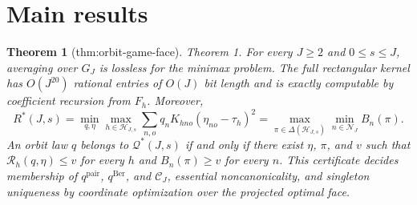 \documentclass{article}
\newtheorem{theorem}{Theorem}
\begin{document}
\section{Main results}

\begin{theorem}[thm:orbit-game-face]\label{thm:orbit-game-face}
Theorem 1. For every \(J\ge2\) and \(0\le s\le J\), averaging over \(G_J\) is lossless for the minimax problem. The full rectangular kernel has \(O(J^{20})\) rational entries of \(O(J)\) bit length and is exactly computable by coefficient recursion from \(F_h\). Moreover, \[R^*(J,s)=\min_{q,\eta}\max_{h\in\mathcal H_{J,s}}\sum_{n,o}q_nK_{hno}(\eta_{no}-\tau_h)^2=\max_{\pi\in\Delta(\mathcal H_{J,s})}\min_{n\in\mathcal N_J}B_n(\pi).\] An orbit law \(q\) belongs to \(\mathcal Q^*(J,s)\) if and only if there exist \(\eta\), \(\pi\), and \(v\) such that \(\mathcal R_h(q,\eta)\le v\) for every \(h\) and \(B_n(\pi)\ge v\) for every \(n\). This certificate decides membership of \(q^{\mathrm{pair}}\), \(q^{\mathrm{Ber}}\), and \(\mathcal C_J\), essential noncanonicality, and singleton uniqueness by coordinate optimization over the projected optimal face.
\end{theorem}
\end{document}
